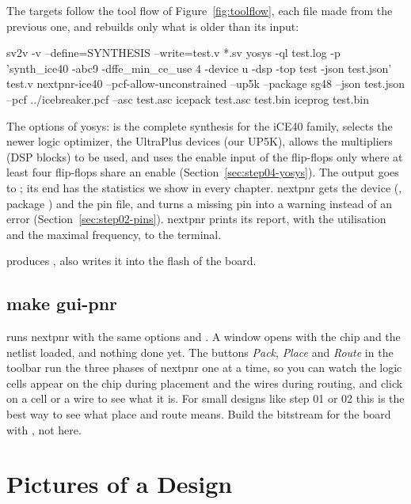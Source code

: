 The targets follow the tool flow of Figure~\ref{fig:toolflow}, each file made
from the previous one, and  rebuilds only what is older than its
input:
\begin{terminal}
sv2v -v --define=SYNTHESIS --write=test.v *.sv
yosys -ql test.log -p 'synth_ice40 -abc9 -dffe_min_ce_use 4 -device u -dsp
      -top test -json test.json' test.v
nextpnr-ice40 --pcf-allow-unconstrained --up5k --package sg48 --json test.json
      --pcf ../icebreaker.pcf --asc test.asc
icepack test.asc test.bin
iceprog test.bin
\end{terminal}
The options of yosys:  is the complete synthesis for the
iCE40 family,  selects the newer logic optimizer,  the
UltraPlus devices (our UP5K),  allows the multipliers (DSP blocks)
to be used, and  uses the enable input of the
flip-flops only where at least four flip-flops share an enable
(Section~\ref{sec:step04-yosys}). The output goes to ; its end
has the statistics we show in every chapter. nextpnr gets the device
(, package ) and the pin file, and
 turns a missing pin into a warning instead of an
error (Section~\ref{sec:step02-pins}). nextpnr prints its report, with the
utilisation and the maximal frequency, to the terminal.

\textbf{} produces , \textbf{}
also writes it into the flash of the board.

\subsection*{make gui-pnr}

runs nextpnr with the same options and . A window opens with the
chip and the netlist loaded, and nothing done yet. The buttons \emph{Pack},
\emph{Place} and \emph{Route} in the toolbar run the three phases of nextpnr
one at a time, so you can watch the logic cells appear on the chip during
placement and the wires during routing, and click on a cell or a wire to see
what it is. For small designs like step 01 or 02 this is the best way to see
what place and route means. Build the bitstream for the board with
, not here.

\section{Pictures of a Design}

